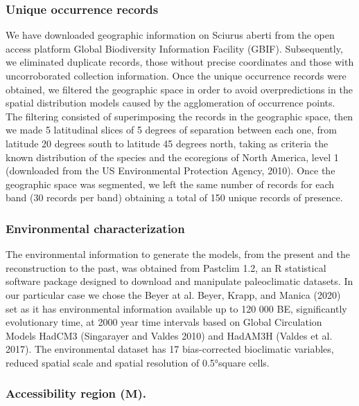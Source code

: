 \documentclass[
]{article}
\begin{document}
\hypertarget{unique-occurrence-records}{%
\subsubsection{Unique occurrence
records}\label{unique-occurrence-records}}

We have downloaded geographic information on Sciurus aberti from the
open access platform Global Biodiversity Information Facility (GBIF).
Subsequently, we eliminated duplicate records, those without precise
coordinates and those with uncorroborated collection information. Once
the unique occurrence records were obtained, we filtered the geographic
space in order to avoid overpredictions in the spatial distribution
models caused by the agglomeration of occurrence points. The filtering
consisted of superimposing the records in the geographic space, then we
made 5 latitudinal slices of 5 degrees of separation between each one,
from latitude 20 degrees south to latitude 45 degrees north, taking as
criteria the known distribution of the species and the ecoregions of
North America, level 1 (downloaded from the US Environmental Protection
Agency, 2010). Once the geographic space was segmented, we left the same
number of records for each band (30 records per band) obtaining a total
of 150 unique records of presence.

\hypertarget{environmental-characterization}{%
\subsubsection{Environmental
characterization}\label{environmental-characterization}}

The environmental information to generate the models, from the present
and the reconstruction to the past, was obtained from Pastclim 1.2, an R
statistical software package designed to download and manipulate
paleoclimatic datasets. In our particular case we chose the Beyer at al.
Beyer, Krapp, and Manica (2020) set as it has environmental information
available up to 120 000 BE, significantly evolutionary time, at 2000
year time intervals based on Global Circulation Models HadCM3
(Singarayer and Valdes 2010) and HadAM3H (Valdes et al. 2017). The
environmental dataset has 17 bias-corrected bioclimatic variables,
reduced spatial scale and spatial resolution of 0.5°square cells.

\hypertarget{accessibility-region-textbfm.}{%
\subsubsection{\texorpdfstring{Accessibility region
(\(\textbf{M}\)).}{Accessibility region (\textbackslash textbf\{M\}).}}\label{accessibility-region-textbfm.}}
\end{document}
